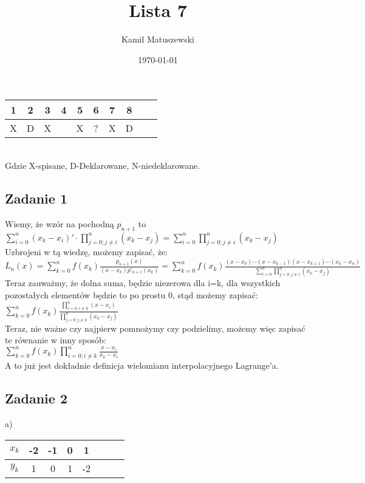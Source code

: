 \documentclass[a4paper]{article}
\title{Lista 7}
\author{Kamil Matuszewski}
\date{\today}
\begin{document}
\maketitle
\setlength{\parindent}{0.5ex}
\setlength{\parskip}{1.5ex}

\begin{center}
\begin{tabular}{|c *{8}{|c} |c|} & 2 & 3 & 4 & 5 & 6 & 7 & 8\\
\hline 
X & D & X &  & X & ? & X & D \\
\hline
\end{tabular}\\
Gdzie X-spisane, D-Deklarowane, N-niedeklarowane.
\end{center}

\subsection*{Zadanie 1}
Wiemy, że wzór na pochodną $p_{n+1}$ to $\sum\limits_{i=0}^{n} (x_k-x_i)' \cdot \prod\limits_{j=0; j \neq i}^{n} (x_k-x_j) = \sum\limits_{i=0}^{n} \prod\limits_{j=0; j \neq i}^{n} (x_k-x_j)$ \\
Uzbrojeni w tą wiedzę, możemy zapisać, że:\\
$L_n(x) = \sum\limits_{k=0}^{n} f(x_k)\frac{p_{n+1}(x)}{(x-x_k)p'_{n+1}(x_k)} = \sum\limits_{k=0}^{n} f(x_k)\frac{(x-x_0)\cdots (x-x_{k-1})(x-x_{k+1})\cdots (x_k - x_n)}{\sum\limits_{i=0}^{n} \prod\limits_{j=0; j \neq i}^{n} (x_k-x_j)} $ \\
Teraz zauważmy, że dolna suma, będzie niezerowa dla i=k, dla wszystkich pozostałych elementów będzie to po prostu 0, stąd możemy zapisać:\\
$\sum\limits_{k=0}^{n} f(x_k)\frac{\prod\limits_{i=0; i \neq k}^{n} (x - x_i)}{\prod\limits_{j=0; j \neq k}^{n} (x_k-x_j)}$\\
Teraz, nie ważne czy najpierw pomnożymy czy podzielimy, możemy więc zapisać te równanie w inny sposób:\\
$\sum\limits_{k=0}^{n} f(x_k)\prod\limits_{i=0; i \neq k}^{n} \frac{x - x_i}{x_k-x_i}$\\
A to już jest dokładnie definicja wielomianu interpolacyjnego Lagrange'a.

\subsection*{Zadanie 2}
a)
\begin{tabular}{|c| *{6}{|c} |c|}\hline
$x_k$ & -2 & -1 & 0 & 1\\
\hline 
$y_k$ & 1  & 0 & 1 & -2 \\
\hline
\end{tabular}\\
\end{document}
